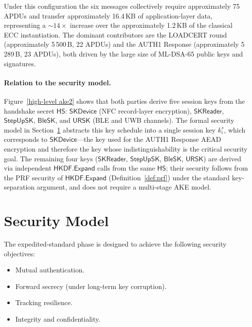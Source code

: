 \documentclass[runningheads]{llncs}
\begin{document}
Under this configuration the six messages collectively require approximately
75 APDUs and transfer approximately 16.4\,KB of application-layer data, representing
a $\sim\!14\times$ increase over the approximately 1.2\,KB of the classical ECC
instantiation.  The dominant contributors are the LOADCERT round
(approximately 5\,500\,B, 22 APDUs) and the AUTH1 Response
(approximately 5\,289\,B, 23 APDUs), both driven by the large size of ML-DSA-65
public keys and signatures.

\paragraph{Relation to the security model.}
Figure~\ref{high-level ake2} shows that both parties derive five session keys
from the handshake secret $\mathsf{HS}$: $\mathsf{SKDevice}$ (NFC record-layer
encryption), $\mathsf{SKReader}$, $\mathsf{StepUpSK}$, $\mathsf{BleSK}$, and
$\mathsf{URSK}$ (BLE and UWB channels).
The formal security model in Section~\ref{sec:model} abstracts this key schedule
into a single session key $k_i^s$, which corresponds to $\mathsf{SKDevice}$---the
key used for the AUTH1 Response AEAD encryption and therefore the key whose
indistinguishability is the critical security goal.
The remaining four keys ($\mathsf{SKReader}$, $\mathsf{StepUpSK}$,
$\mathsf{BleSK}$, $\mathsf{URSK}$) are derived via independent $\mathsf{HKDF.Expand}$
calls from the same $\mathsf{HS}$; their security follows from the PRF security
of $\mathsf{HKDF.Expand}$ (Definition~\ref{def:prf}) under the standard
key-separation argument, and does not require a multi-stage AKE model.

\section{Security Model}
\label{sec:model}

The expedited-standard phase is designed to achieve the following security objectives:
\begin{itemize}
    \item Mutual authentication.
    \item Forward secrecy (under long-term key corruption).
    \item Tracking resilience.
    \item Integrity and confidentiality.
\end{itemize}
\end{document}
